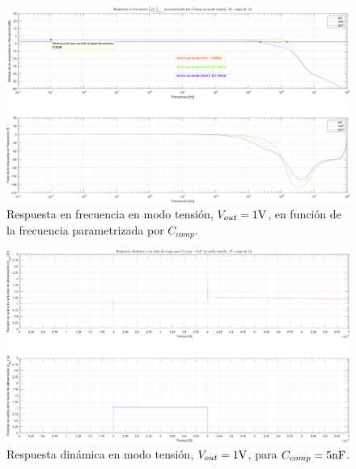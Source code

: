 \clearpage

\begin{figure}[H] %
\begin{center}
\includegraphics[width=1.1 \textwidth, angle=90]{./img/plots/rf/power_supply_CCOMP_RF_Modo2.png}
\caption{\label{fig:fig_power_supply_CCOMP_RF_Modo2}\footnotesize{Respuesta en frecuencia en modo tensión, $V_{out} = 1 \si[per-mode=symbol]{\volt}$, en función de la frecuencia parametrizada por $C_{comp}$.}}
\end{center}
\end{figure}

\clearpage

\begin{figure}[H] %
\begin{center}
\includegraphics[width=1.1 \textwidth, angle=90]{./img/plots/dynamic/power_supply_CCOMP_5n_STEP_Modo2.png}
\caption{\label{fig:fig_power_supply_CCOMP_STEP_5n_Modo2}\footnotesize{Respuesta dinámica en modo tensión, $V_{out} = 1 \si[per-mode=symbol]{\volt}$, para $C_{comp} = 5 \si[per-mode=symbol]{\nano\farad} $.}}
\end{center}
\end{figure}

